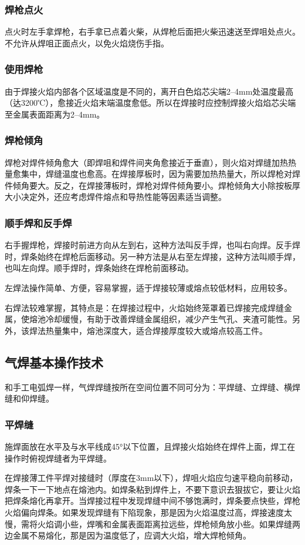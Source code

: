 \documentclass{ctexbook}
\begin{document}
\subsubsection{焊枪点火}
点火时左手拿焊枪，右手拿已点着火柴，从焊枪后面把火柴迅速送至焊咀处点火。不允许从焊咀正面点火，以免火焰烧伤手指。
\subsubsection{使用焊枪}
由于焊接火焰内部各个区域温度是不同的，离开白色焰芯尖端2--4mm处温度最高（达3200℃），愈接近火焰末端温度愈低。所以在焊接时应控制焊接火焰焰芯尖端至金属表面距离为2--4mm。
\subsubsection{焊枪倾角}
焊枪对焊件倾角愈大（即焊咀和焊件间夹角愈接近于垂直），则火焰对焊缝加热热量愈集中，焊缝温度也愈高。在焊接厚板时，因为需要加热热量大，所以焊枪对焊件倾角要大。反之，在焊接薄板时，焊枪对焊件倾角要小。焊枪倾角大小除按板厚大小决定外，还应考虑焊件熔点和导热性能等因素适当调整。
\subsubsection{顺手焊和反手焊}
右手握焊枪，焊接时前进方向从左到右，这种方法叫反手焊，也叫右向焊。反手焊时，焊条始终在焊枪后面移动。另一种方法是从右至左焊接，这种方法叫顺手焊，也叫左向焊。顺手焊时，焊条始终在焊枪前面移动。

左焊法操作简单、方便，容易掌握，适于焊接较薄或熔点较低材料，应用较多。

右焊法较难掌握，其特点是：在焊接过程中，火焰始终笼罩着已焊接完成焊缝金属，使熔池冷却缓慢，有助于改善焊缝金属组织，减少产生气孔、夹渣可能性。另外，该焊法热量集中，熔池深度大，适合焊接厚度较大或熔点较高工件。
\subsection{气焊基本操作技术}
和手工电弧焊一样，气焊焊缝按所在空间位置不同可分为：平焊缝、立焊缝、横焊缝和仰焊缝。
\subsubsection{平焊缝}
施焊面放在水平及与水平线成45°以下位置，且焊接火焰始终在焊件上面，焊工在操作时俯视焊缝者为平焊缝。

在焊接薄工件平焊对接缝时（厚度在3mm以下），焊咀火焰应匀速平稳向前移动，焊条一下一下地点在熔池内。如焊条粘到焊件上，不要下意识去狠拔它，要让火焰把焊条熔化再拿开。当焊接过程中发现焊缝中间不够饱满时，焊条要点快些，焊枪火焰偏向焊条。如果发现焊缝有下陷现象，那是因为火焰温度过高，焊接速度太慢，需将火焰调小些，焊嘴和金属表面距离拉远些，焊枪倾角放小些。如果焊缝两边金属不易熔化，那是因为温度低了，应调大火焰，增大焊枪倾角。
\end{document}
